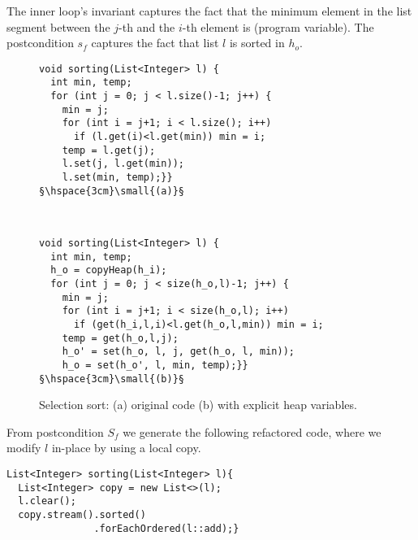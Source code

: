 \documentclass[runningheads,a4paper]{llncs}
\begin{document}
The inner loop's invariant captures the fact that the minimum element in the
list segment between the $j$-th and the $i$-th element is 
(program variable).  The postcondition $s_f$ captures the fact that
list $l$ is sorted in $h_o$.

\begin{figure*}
\begin{framed}
\begin{minipage}{.5\textwidth}
  \begin{lstlisting}[mathescape=true,showstringspaces=false,escapechar={§}]
void sorting(List<Integer> l) {
  int min, temp;
  for (int j = 0; j < l.size()-1; j++) {
    min = j; 
    for (int i = j+1; i < l.size(); i++)
      if (l.get(i)<l.get(min)) min = i; 
    temp = l.get(j);
    l.set(j, l.get(min));
    l.set(min, temp);}}
§\hspace{3cm}\small{(a)}§
\end{lstlisting}
\end{minipage}\\
\begin{minipage}{.45\textwidth}
  \begin{lstlisting}[mathescape=true,showstringspaces=false,escapechar={§}]
void sorting(List<Integer> l) {
  int min, temp;
  h_o = copyHeap(h_i);
  for (int j = 0; j < size(h_o,l)-1; j++) {
    min = j; 
    for (int i = j+1; i < size(h_o,l); i++)
      if (get(h_i,l,i)<l.get(h_o,l,min)) min = i;
    temp = get(h_o,l,j);
    h_o' = set(h_o, l, j, get(h_o, l, min));
    h_o = set(h_o', l, min, temp);}}
§\hspace{3cm}\small{(b)}§
\end{lstlisting}
\end{minipage}
\end{framed}
\caption{Selection sort: (a) original code (b) with explicit heap variables.}
\label{ex:sort}
\end{figure*}

From postcondition $S_f$ we generate the following refactored code, where we modify 
$l$ in-place by using a local copy. %

\begin{lstlisting}[mathescape=true,showstringspaces=false]
List<Integer> sorting(List<Integer> l){
  List<Integer> copy = new List<>(l);
  l.clear();
  copy.stream().sorted()
               .forEachOrdered(l::add);}
\end{lstlisting}
\end{document}
